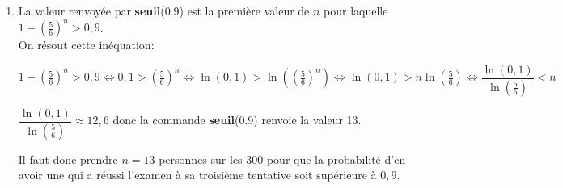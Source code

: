 \begin{enumerate}
\begin{enumerate}
		\item %
La valeur renvoyée par \textbf{seuil}(0.9) est la première valeur de $n$ pour laquelle $1-\left (\frac{5}{6}\right )^n >0,9$. \\
On résout cette inéquation:
		
$1-\left (\frac{5}{6}\right )^n >0,9
\iff 
0,1 > \left (\frac{5}{6}\right )^n
\iff
\ln(0,1) > \ln\left (\left (\frac{5}{6}\right )^n\right )
\iff
\ln(0,1) > n\ln\left (\frac{5}{6}\right )
\iff
\dfrac{\ln(0,1)}{\ln\left (\frac{5}{6}\right )} < n
$		

$\dfrac{\ln(0,1)}{\ln\left (\frac{5}{6}\right )}\approx 12,6$ donc la commande \textbf{seuil}(0.9) renvoie la valeur 13.

Il faut donc prendre $n=13$ personnes sur les 300 pour que la probabilité d'en avoir une qui a réussi l'examen à sa troisième tentative soit supérieure à $0,9$.
		
		
	\end{enumerate}
\end{enumerate}



